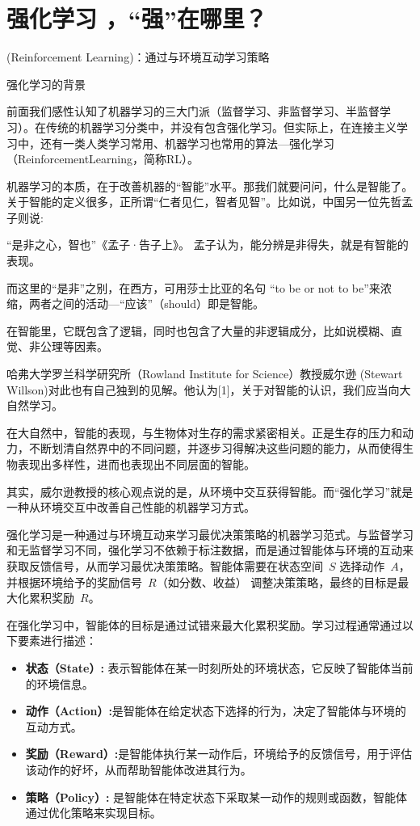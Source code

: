 \chapter{强化学习 ，“强”在哪里？}
(Reinforcement Learning)：通过与环境互动学习策略


 强化学习的背景
 
前面我们感性认知了机器学习的三大门派（监督学习、非监督学习、半监督学习）。在传统的机器学习分类中，并没有包含强化学习。但实际上，在连接主义学习中，还有一类人类学习常用、机器学习也常用的算法—强化学习（ReinforcementLearning，简称RL）。

机器学习的本质，在于改善机器的“智能”水平。那我们就要问问，什么是智能了。关于智能的定义很多，正所谓“仁者见仁，智者见智”。比如说，中国另一位先哲孟子则说:

“是非之心，智也”《孟子·告子上》。
孟子认为，能分辨是非得失，就是有智能的表现。

而这里的“是非”之别，在西方，可用莎士比亚的名句 “to be or not to be”来浓缩，两者之间的活动---“应该”（should）即是智能。

在智能里，它既包含了逻辑，同时也包含了大量的非逻辑成分，比如说模糊、直觉、非公理等因素。

哈弗大学罗兰科学研究所（Rowland Institute for Science）教授威尔逊 (Stewart Willson)对此也有自己独到的见解。他认为[1]，关于对智能的认识，我们应当向大自然学习。

在大自然中，智能的表现，与生物体对生存的需求紧密相关。正是生存的压力和动力，不断划清自然界中的不同问题，并逐步习得解决这些问题的能力，从而使得生物表现出多样性，进而也表现出不同层面的智能。

其实，威尔逊教授的核心观点说的是，从环境中交互获得智能。而“强化学习”就是一种从环境交互中改善自己性能的机器学习方式。


强化学习是一种通过与环境互动来学习最优决策策略的机器学习范式。与监督学习和无监督学习不同，强化学习不依赖于标注数据，而是通过智能体与环境的互动来获取反馈信号，从而学习最优决策策略。智能体需要在状态空间~$S$ 选择动作~$A$，并根据环境给予的奖励信号~$R$（如分数、收益） 调整决策策略，最终的目标是最大化累积奖励~$R$。

在强化学习中，智能体的目标是通过试错来最大化累积奖励。学习过程通常通过以下要素进行描述：
\begin{itemize}
\item {\bf 状态（State）:} 表示智能体在某一时刻所处的环境状态，它反映了智能体当前的环境信息。
\item {\bf  动作（Action）:}是智能体在给定状态下选择的行为，决定了智能体与环境的互动方式。
\item {\bf 奖励（Reward）:}是智能体执行某一动作后，环境给予的反馈信号，用于评估该动作的好坏，从而帮助智能体改进其行为。
\item {\bf  策略（Policy）:} 是智能体在特定状态下采取某一动作的规则或函数，智能体通过优化策略来实现目标。
\end{itemize}

